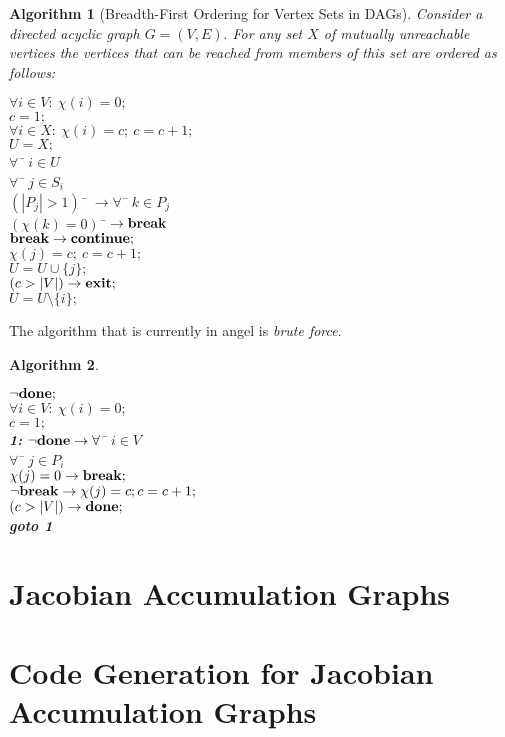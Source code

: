 \documentclass{book}
\newtheorem{Alg}{Algorithm}
\begin{document}
\begin{Alg}[Breadth-First Ordering for Vertex Sets in DAGs]
Consider a directed acyclic graph $G=(V,E).$ For any set $X$ of mutually 
unreachable vertices the vertices that can be reached from members of this set
are ordered as follows: 
\begin{tabbing}
$\forall i \in V :~\chi(i)=0;$ \\
$c=1;$ \\
$\forall i \in X :~\chi(i)=c;~c=c+1;$ \\
$U=X;$ \\
$\forall$ \= $i \in U$ \\
\> $\forall$ \= $j \in S_i$ \\
\> \> $(|P_j|>1)$ \= $ \rightarrow \forall$ \= $k \in P_j$ \\
\>\>\>\> $(\chi(k)=0)$ \= $\rightarrow {\bf break}$ \\
\>\> ${\bf break} \rightarrow {\bf continue};$ \\
\>\> $\chi(j)=c;~c=c+1;$ \\
\>\> $U = U \cup \{j\};$ \\
\>\> $(c>|V|) \rightarrow {\bf exit};$ \\
\> $U = U \setminus \{i\};$ 
\end{tabbing}
\end{Alg}

The algorithm that is currently in angel is {\em brute force}.
\begin{Alg}
\begin{tabbing}
$\neg {\bf done};$ \\
$\forall i \in V :~\chi(i)=0;$ \\
$c=1;$ \\
{\bf 1:} $\neg {\bf done} \rightarrow \forall $ \= $i \in V$ \\
\> $\forall$ \= $ j \in P_i$ \\
\>\> $\chi(j) =0 \rightarrow {\bf break};$ \\
\> $\neg {\bf break} \rightarrow \chi(j)=c; c=c+1;$ \\
\> $(c>|V|) \rightarrow {\bf done};$ \\
{\bf goto 1} 
\end{tabbing}
\end{Alg}

\section{Jacobian Accumulation Graphs}

\section{Code Generation for Jacobian Accumulation Graphs}
\label{sec:code_gen_jac_acc}
\end{document}
